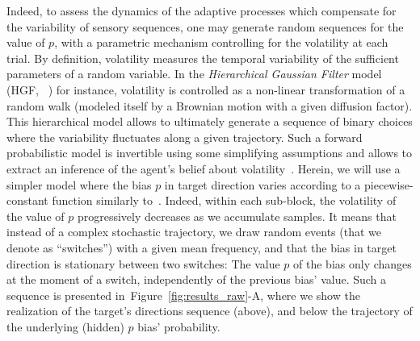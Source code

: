 \documentclass[12pt,english]{article}%
\newcommand{\citep}[1]{\parencite{#1}}
\newcommand{\citet}[1]{\textcite{#1}}
\newcommand{\seeFig}[1]{Figure~\ref{fig:#1}}
\newcommand{\AM}[1]{\textbf{\textcolor{blue}{[AM: #1]}}}
\begin{document}
Indeed, to assess the dynamics of the adaptive processes
which compensate for the variability of sensory sequences,
one may generate random sequences for the value of $p$,
with a parametric mechanism controlling for the volatility at each trial.
By definition, volatility measures the temporal variability
of the sufficient parameters of a random variable.
In the \emph{Hierarchical Gaussian Filter} model (HGF, ~\citet{Mathys11}) for instance,
volatility is controlled as a non-linear transformation
of a random walk (modeled itself by a Brownian motion with a given diffusion factor).
This hierarchical model allows to ultimately generate a sequence of binary choices
where the variability fluctuates along a given trajectory.
Such a forward probabilistic model is invertible
using some simplifying assumptions and allows
to extract an inference of the agent's belief about volatility~\citep{Vossel14}.
Herein, we will use a simpler model where
the bias $p$ in target direction varies according to a piecewise-constant function
similarly to~\citet{Meyniel13}.
Indeed, within each sub-block, the volatility of the value of $p$
progressively decreases as we accumulate samples.
It means that instead of a complex stochastic trajectory,
we draw random events (that we denote as ``switches'')
with a given mean frequency,
and that the bias in target direction is stationary between two switches:
The value $p$ of the bias only changes at the moment of a switch,
independently of the previous bias' value.
Such a sequence is presented in~\seeFig{results_raw}-A, %
where we show the realization of the target's directions sequence (above), and
below the trajectory of the underlying (hidden) $p$ bias' probability.
\end{document}
